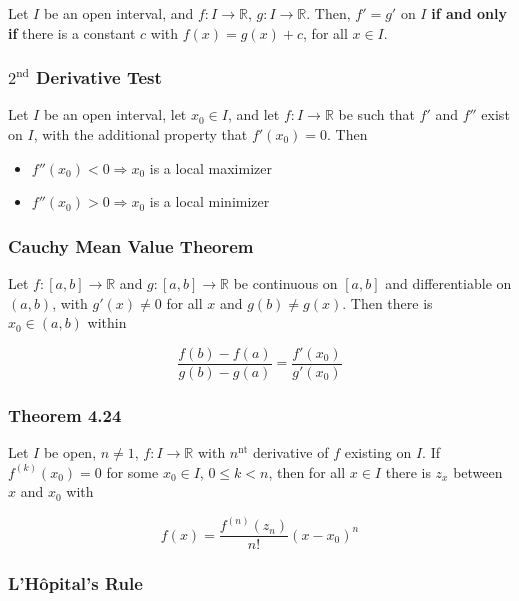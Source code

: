 \documentclass[12pt,letterpaper]{article}
\newcommand{\R}{{\mathbb R}}
\begin{document}
\begin{multicols*}{2}
        Let $I$ be an open interval, and $f: I \rightarrow \R$, $g: I
        \rightarrow \R$. Then, $f' = g'$ on $I$ {\bf if and only if} there is a
        constant $c$ with $f(x) = g(x) + c$, for all $x \in I$.


        \subsubsection{$2^{\text{nd}}$ Derivative Test}

        Let $I$ be an open interval, let $x_0 \in I$, and let $f: I \rightarrow
        \R$ be such that $f'$ and $f''$ exist on $I$, with the additional
        property that $f'(x_0) = 0$. Then

        \begin{itemize}
          \item $f''(x_0) < 0 \Rightarrow x_0$ is a local maximizer
          \item $f''(x_0) > 0 \Rightarrow x_0$ is a local minimizer
        \end{itemize}

        \subsubsection{Cauchy Mean Value Theorem}

        Let $f: [a, b] \rightarrow \R$ and $g: [a, b] \rightarrow \R$ be
        continuous on $[a, b]$ and differentiable on $(a, b)$, with $g'(x) \ne
        0$ for all $x$ and $g(b) \ne g(x)$. Then there is $x_0 \in (a, b)$ within

        \[
          \frac{f(b) - f(a)}{g(b) - g(a)} = \frac{f'(x_0)}{g'(x_0)}
        \]

        \subsubsection{Theorem 4.24}

        Let $I$ be open, $n \ne 1$, $f: I \rightarrow \R$ with $n^{\text{nt}}$
        derivative of $f$ existing on $I$. If $f^{(k)}(x_0) = 0$ for some $x_0
        \in I$, $0 \le k < n$, then for all $x \in I$ there is $z_x$ between $x$
        and $x_0$ with

        \[
          f(x) = \frac{f^{(n)}(z_n)}{n!}(x - x_0)^n
        \]

        \subsubsection{L'H\^opital's Rule}


\end{multicols*}
\end{document}
